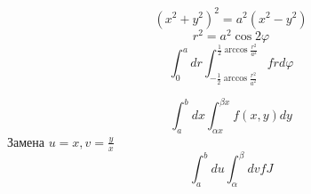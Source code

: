 \begin{exercise}
    \[(x^2 + y^2)^2 = a^2(x^2 - y^2)\]
    \[r^2 = a^2 \cos 2\varphi\]
    \[\int_0^a dr \int_{ - \frac{1}{2} \arccos \frac{r^2}{a^2} }^{ \frac{1}{2} \arccos \frac{r^2}{a^2} } f r d\varphi\]
\end{exercise}

\begin{exercise}[3957]
    \[\int_a^b dx \int_{\alpha x}^{\beta x} f(x, y) dy\]
    Замена \(u = x, v = \frac{y}{x}\)
    \[\int_a^b du \int_{\alpha}^{\beta} dv f J\]
\end{exercise}

